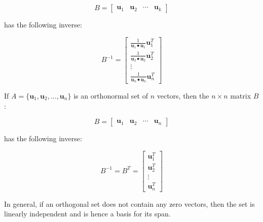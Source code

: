 \documentclass{article}
\begin{document}
\[B = \begin{bmatrix} \mathbf{u}_1 & \mathbf{u}_2 & \cdots & \mathbf{u}_k \end{bmatrix}\]

has the following inverse:

\[B^{-1} = \begin{bmatrix} \frac{1}{\mathbf{u}_1 \bullet \mathbf{u}_1}\mathbf{u}_1^T \\ \frac{1}{\mathbf{u}_2 \bullet \mathbf{u}_2}\mathbf{u}_2^T \\ \vdots \\ \frac{1}{\mathbf{u}_n \bullet \mathbf{u}_n}\mathbf{u}_n^T \end{bmatrix}\]


\vspace{5mm}

If \(A = \{\mathbf{u}_1, \mathbf{u}_2, ..., \mathbf{u}_n\}\) is an orthonormal set of \(n\) vectors, then the \(n \times n\) matrix \(B\): 

\[B = \begin{bmatrix} \mathbf{u}_1 & \mathbf{u}_2 & \cdots & \mathbf{u}_n \end{bmatrix}\]

has the following inverse:

\[B^{-1} = B^T = \begin{bmatrix} \mathbf{u}_1^T \\ \mathbf{u}_2^T \\ \vdots \\ \mathbf{u}_n^T \end{bmatrix}\]


\vspace{5mm}

In general, if an orthogonal set does not contain any zero vectors, then the set is linearly independent and is hence a basis for its span.


\vspace{5mm}
\end{document}
